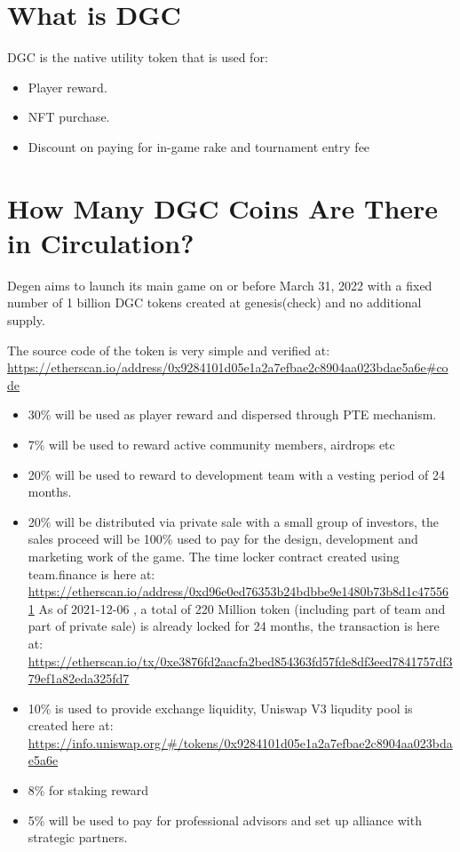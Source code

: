\documentclass[
]{book}
\providecommand{\tightlist}{%
  \setlength{\itemsep}{0pt}\setlength{\parskip}{0pt}}
\begin{document}
\hypertarget{what-is-dgc}{%
\section{What is DGC}\label{what-is-dgc}}

DGC is the native utility token that is used for:

\begin{itemize}
\tightlist
\item
  Player reward.
\item
  NFT purchase.
\item
  Discount on paying for in-game rake and tournament entry fee
\end{itemize}

\hypertarget{how-many-dgc-coins-are-there-in-circulation}{%
\section{How Many DGC Coins Are There in Circulation?}\label{how-many-dgc-coins-are-there-in-circulation}}

Degen aims to launch its main game on or before March 31, 2022 with a fixed number of 1 billion DGC tokens created at genesis(check) and no additional supply.

The source code of the token is very simple and verified at:
\url{https://etherscan.io/address/0x9284101d05e1a2a7efbae2c8904aa023bdae5a6e\#code}

\begin{itemize}
\tightlist
\item
  30\% will be used as player reward and dispersed through PTE mechanism.
\item
  7\% will be used to reward active community members, airdrops etc
\item
  20\% will be used to reward to development team with a vesting period of 24 months.
\item
  20\% will be distributed via private sale with a small group of investors, the sales proceed will be 100\% used to pay for the design, development and marketing work of the game.
  The time locker contract created using team.finance is here at:
  \url{https://etherscan.io/address/0xd96e0ed76353b24bdbbe9e1480b73b8d1c475561}
  As of 2021-12-06 , a total of 220 Million token (including part of team and part of private sale) is already locked for 24 months, the transaction is here at:
  \url{https://etherscan.io/tx/0xe3876fd2aacfa2bed854363fd57fde8df3eed7841757df379ef1a82eda325fd7}
\item
  10\% is used to provide exchange liquidity,
  Uniswap V3 liqudity pool is created here at:
  \url{https://info.uniswap.org/\#/tokens/0x9284101d05e1a2a7efbae2c8904aa023bdae5a6e}
\item
  8\% for staking reward
\item
  5\% will be used to pay for professional advisors and set up alliance with strategic partners.
\end{itemize}
\end{document}
